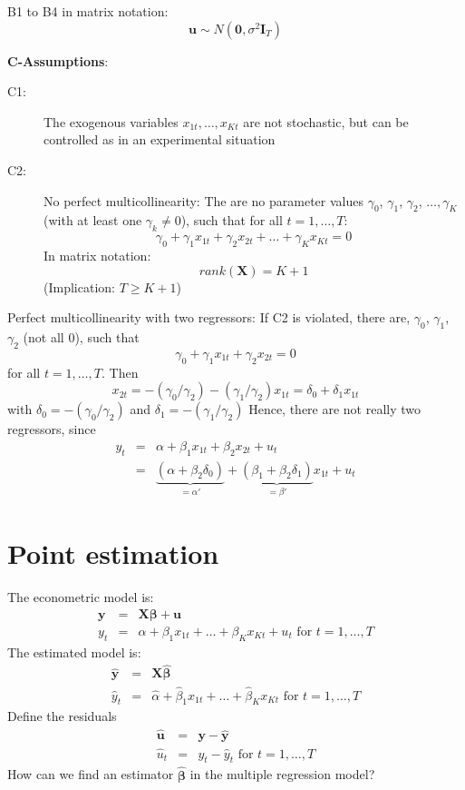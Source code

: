 \documentclass{article}
\begin{document}
B1 to B4 in matrix notation:
\[ \mathbf{u}\sim N\left( \mathbf{0},\sigma ^{2}\mathbf{I}_{T}\right) \]

\textbf{C-Assumptions}:
\begin{description}
\item[C1:] The exogenous variables $x_{1t},\ldots ,x_{Kt}$ are
not stochastic, but can be controlled as in an experimental situation
\item[C2:] No perfect multicollinearity: The are no parameter
values
$\gamma _{0}$, $\gamma _{1}$, $\gamma _{2}$, $\ldots ,\gamma _{K}$
(with at least one $\gamma _{k}\neq 0$), such that for all $t=1,\ldots ,T$:
\[ \gamma _{0}+\gamma _{1}x_{1t}+\gamma _{2}x_{2t}+\ldots +\gamma _{K}x_{Kt}=0 \]
In matrix notation:
\[ rank(\mathbf{X})=K+1 \]
(Implication: $T\geq K+1$)
\end{description}

Perfect multicollinearity with two regressors: If C2 is violated, there are,
$\gamma _{0}$, $\gamma _{1}$, $\gamma_{2}$ (not all 0), such that
\[ \gamma _{0}+\gamma _{1}x_{1t}+\gamma _{2}x_{2t}=0 \]
for all $t=1,\ldots ,T$. Then
\[ x_{2t}=-\left( \gamma _{0}/\gamma _{2}\right) -\left( \gamma _{1}/\gamma_{2}\right) x_{1t}=\delta _{0}+\delta _{1}x_{1t} \]
with $\delta _{0}=-\left( \gamma _{0}/\gamma _{2}\right) $ and $\delta_{1}=-\left( \gamma _{1}/\gamma _{2}\right)$
Hence, there are not really two regressors, since
\begin{eqnarray*}
y_{t} &=&\alpha +\beta _{1}x_{1t}+\beta _{2}x_{2t}+u_{t}\, \\
&=&\underbrace{\left( \alpha +\beta _{2}\delta _{0}\right) }_{=\alpha'}
+\underbrace{\left( \beta _{1}+\beta _{2}\delta _{1}\right) }_{=\beta '}x_{1t}+u_{t}
\end{eqnarray*}

\section{Point estimation}

The econometric model is:
\begin{eqnarray*}
\mathbf{y} &=&\mathbf{X\beta }+\mathbf{u} \\
y_{t} &=&\alpha +\beta _{1}x_{1t}+\ldots +\beta _{K}x_{Kt}+u_{t}\text{ for }t=1,\ldots ,T
\end{eqnarray*}
The estimated model is:
\begin{eqnarray*}
\mathbf{\hat{y}} &=&\mathbf{X\hat{\beta}} \\
\hat{y}_{t} &=&\hat{\alpha}+\hat{\beta}_{1}x_{1t}+\ldots +\hat{\beta}_{K}x_{Kt}\text{ for }t=1,\ldots ,T
\end{eqnarray*}
Define the residuals
\begin{eqnarray*}
\mathbf{\hat{u}} &=&\mathbf{y}-\mathbf{\hat{y}} \\
\hat{u}_{t} &=&y_{t}-\hat{y}_{t}\text{ for }t=1,\ldots ,T
\end{eqnarray*}
How can we find an estimator $\mathbf{\hat{\beta}}$ in the multiple
regression model?
\end{document}
